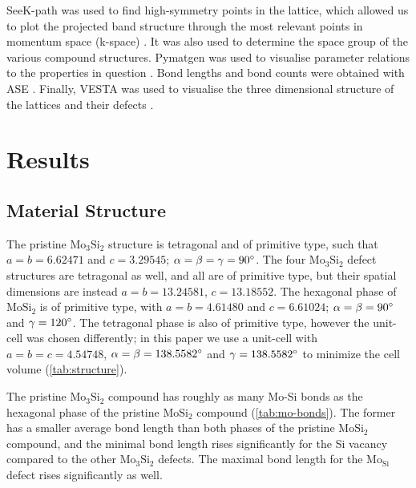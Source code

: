 \documentclass[7.5pt]{article}
\theoremstyle{plain}
\theoremstyle{definition}
\newcommand{\<}{\langle}
\renewcommand{\>}{\rangle}
\begin{document}
\begin{multicols}{2}
SeeK-path was used to find high-symmetry points in the lattice, which allowed us to plot the projected band structure through the most relevant points in momentum space (k-space) \cite{HINUMA2017140, togo, HjorthLarsen_2017, qe-tools, ONG2013314}.
It was also used to determine the space group of the various compound structures.
Pymatgen was used to visualise parameter relations to the properties in question \cite{ONG2013314}.
Bond lengths and bond counts were obtained with ASE \cite{ase-paper, ISI:000175131400009}.
Finally, VESTA was used to visualise the three dimensional structure of the lattices and their defects \cite{Momma:ko5060, Momma:db5098}.

\end{multicols}

\smallskip
\section{Results}



\subsection{Material Structure}

\begin{multicols}{2}

\noindent The pristine $\text{Mo}_3\text{Si}_2$ structure is tetragonal and of primitive type, such that $a=b=6.62471$ and $c=3.29545$; $\alpha=\beta=\gamma=90 \degree$.
The four $\text{Mo}_3\text{Si}_2$ defect structures are tetragonal as well, and all are of primitive type, but their spatial dimensions are instead $a=b=13.24581$, $c=13.18552$.
The hexagonal phase of $\text{MoSi}_2$ is of primitive type, with $a=b=4.61480$ and $c=6.61024$; $\alpha=\beta=90 \degree$ and $\gamma=120 \degree$. 
The tetragonal phase is also of primitive type, however the unit-cell was chosen differently; in this paper we use a unit-cell with $a=b=c=4.54748$, $\alpha=\beta=138.5582 \degree$ and $\gamma=138.5582 \degree$ to minimize the cell volume (\autoref{tab:structure}).

The pristine $\text{Mo}_3\text{Si}_2$ compound has roughly as many Mo-Si bonds as the hexagonal phase of the pristine $\text{MoSi}_2$ compound (\autoref{tab:mo-bonds}).
The former has a smaller average bond length than both phases of the pristine $\text{MoSi}_2$ compound, and the minimal bond length rises significantly for the Si vacancy compared to the other $\text{Mo}_3\text{Si}_2$ defects.
The maximal bond length for the $\text{Mo}_\text{Si}$ defect rises significantly as well.

\end{multicols}
\end{document}
